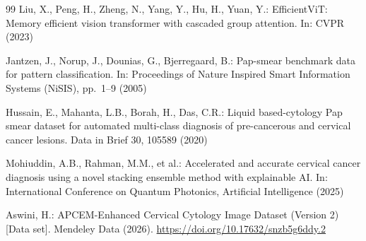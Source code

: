 \documentclass[runningheads]{llncs}
\begin{document}
\begin{thebibliography}{99}
Liu, X., Peng, H., Zheng, N., Yang, Y., Hu, H., Yuan, Y.: EfficientViT:
Memory efficient vision transformer with cascaded group attention. In:
CVPR (2023)

Jantzen, J., Norup, J., Dounias, G., Bjerregaard, B.: Pap-smear benchmark
data for pattern classification. In: Proceedings of Nature Inspired Smart
Information Systems (NiSIS), pp.\ 1--9 (2005)

Hussain, E., Mahanta, L.B., Borah, H., Das, C.R.: Liquid based-cytology
Pap smear dataset for automated multi-class diagnosis of pre-cancerous
and cervical cancer lesions. Data in Brief 30, 105589 (2020)

Mohiuddin, A.B., Rahman, M.M., et al.: Accelerated and accurate cervical
cancer diagnosis using a novel stacking ensemble method with explainable
AI. In: International Conference on Quantum Photonics, Artificial
Intelligence (2025)

Aswini, H.: APCEM-Enhanced Cervical Cytology Image Dataset (Version 2)
[Data set]. Mendeley Data (2026). \url{https://doi.org/10.17632/snzb5g6ddy.2}

\end{thebibliography}
\end{document}
